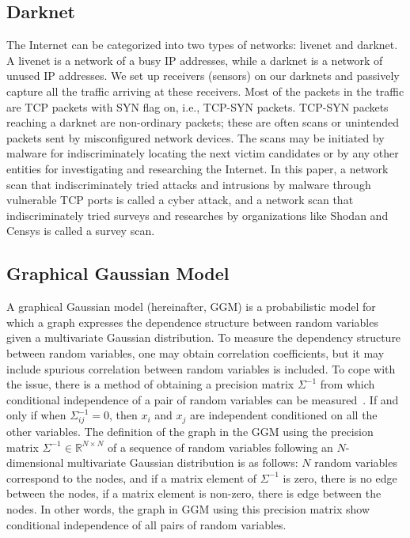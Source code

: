 \documentclass[conference]{IEEEtran}
\begin{document}
\subsection{Darknet}
The Internet can be categorized into two types of networks: livenet and darknet.
A livenet is a network of a busy IP addresses, while a darknet is a network of unused IP addresses.
We set up receivers (sensors) on our darknets and passively capture all the traffic arriving at these receivers.
Most of the packets in the traffic are TCP packets with SYN flag on, i.e., TCP-SYN packets.
TCP-SYN packets reaching a darknet are non-ordinary packets; these are often scans or unintended packets sent by misconfigured network devices.
The scans may be initiated by malware for indiscriminately locating the next victim candidates or by any other entities for investigating and researching the Internet.
In this paper, a network scan that indiscriminately tried attacks and intrusions by malware through vulnerable TCP ports is called a cyber attack, and a network scan that indiscriminately tried surveys and researches by organizations like Shodan and Censys is called a survey scan.



\subsection{Graphical Gaussian Model}
A graphical Gaussian model (hereinafter, GGM) is a probabilistic model for which a graph expresses the dependence structure between random variables given a multivariate Gaussian distribution.
To measure the dependency structure between random variables, one may obtain correlation coefficients, but it may include spurious correlation between random variables is included.
To cope with the issue, there is a method of obtaining a precision matrix $\Sigma^{-1}$ from which conditional independence of a pair of random variables can be measured~\cite{Ide}.
If and only if when $\Sigma^{-1}_{ij}=0$, then $x_ {i}$ and $x_ {j}$ are independent conditioned on all the other variables.
The definition of the graph in the GGM using the precision matrix $\Sigma^{-1}\in\mathbb{R}^{N \times N}$ of a sequence of random variables following an $N$-dimensional multivariate Gaussian distribution is as follows: $N$ random variables correspond to the nodes, and if a matrix element of $\Sigma^{-1}$ is zero, there is no edge between the nodes, if a matrix element is non-zero, there is edge between the nodes.
In other words, the graph in GGM using this precision matrix show conditional independence of all pairs of random variables.
\end{document}
